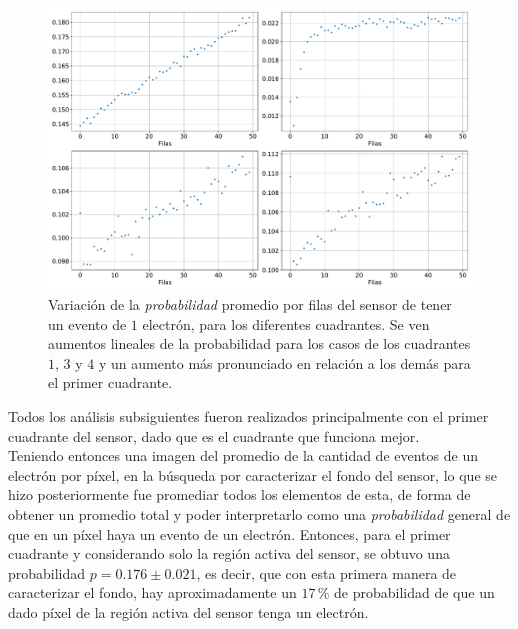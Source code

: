 \begin{figure}[h]
    \centering
    \includegraphics[scale=0.45]{Figs/Gradiente_en_filas_sensor.pdf}
    \caption{\footnotesize{Variación de la \textit{probabilidad} promedio por filas del sensor de tener un evento de $1$ electrón, para los diferentes cuadrantes. Se ven aumentos lineales de la probabilidad para los casos de los cuadrantes $1$, $3$ y $4$ y un aumento más pronunciado en relación a los demás para el primer cuadrante.}}
    \label{fig:GradienteProb}
\end{figure}
\indent Todos los análisis subsiguientes fueron realizados principalmente con el primer cuadrante del sensor, dado que es el cuadrante que funciona mejor.\\
\indent Teniendo entonces una imagen del promedio de la cantidad de eventos de un electrón por píxel, en la búsqueda por caracterizar el fondo del sensor, lo que se hizo posteriormente fue promediar todos los elementos de esta, de forma de obtener un promedio total y poder interpretarlo como una \textit{probabilidad} general de que en un píxel haya un evento de un electrón. Entonces, para el primer cuadrante y considerando solo la región activa del sensor, se obtuvo una probabilidad $p = 0.176 \pm 0.021$, es decir, que con esta primera manera de caracterizar el fondo, hay aproximadamente un $17\,\%$ de probabilidad de que un dado píxel de la región activa del sensor tenga un electrón.\\
